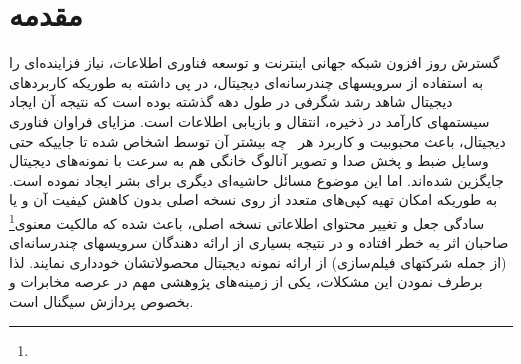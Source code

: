 \chapter{مقدمه} \label{ch:Introduction}

گسترش روز افزون شبکه جهانی اینترنت و توسعه فناوری اطلاعات، نیاز فزاینده‌ای را به استفاده از
سرویسهای چندرسانه‌ای دیجیتال،  در پی داشته به طوریکه کاربردهای دیجیتال شاهد رشد
شگرفی در طول دهه گذشته بوده است که نتیجه  آن ایجاد سیستمهای  کارآمد در ذخیره، انتقال 
و بازیابی اطلاعات است. مزایای فراوان فناوری دیجیتال، باعث محبوبیت و کاربرد هر~
چه بیشتر آن توسط اشخاص شده تا جاییکه حتی وسایل ضبط و پخش صدا و تصویر آنالوگ خانگی
هم به سرعت با نمونه‌های دیجیتال جایگزین شده‌اند. اما این موضوع مسائل حاشیه‌ای دیگری
برای بشر ایجاد نموده است. به طوریکه امکان تهیه کپی‌های متعدد از روی نسخه اصلی 
بدون کاهش کیفیت آن و یا سادگی جعل و تغییر محتوای اطلاعاتی نسخه اصلی، باعث شده که 
مالکیت  معنوی\footnote{} صاحبان اثر به خطر افتاده و در 
نتیجه بسیاری از ارائه دهندگان سرویسهای چندرسانه‌ای (از جمله شرکتهای فیلم‌سازی)
از ارائه نمونه دیجیتال محصولاتشان خودداری نمایند. لذا برطرف نمودن این مشکلات،
یکی از زمینه‌های پژوهشی مهم در عرصه مخابرات و بخصوص پردازش سیگنال است. 

              
    
